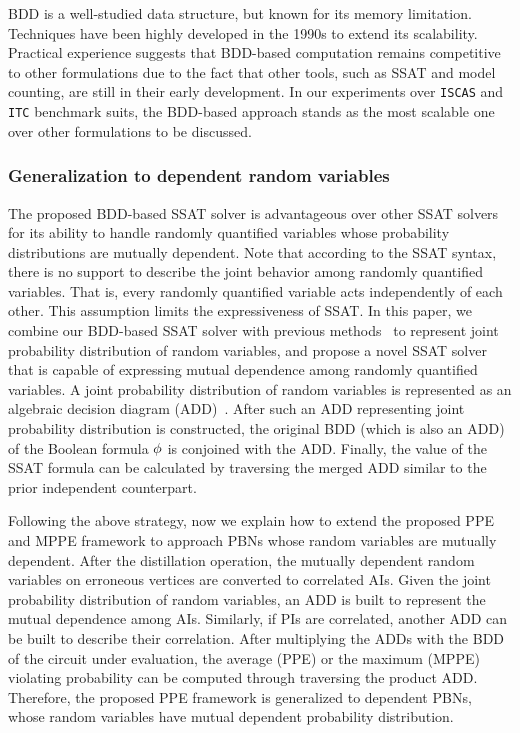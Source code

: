 BDD is a well-studied data structure,
but known for its memory limitation.
Techniques have been highly developed in the 1990s to extend its scalability.
Practical experience suggests that BDD-based computation remains competitive to other formulations
due to the fact that other tools,
such as SSAT and model counting,
are still in their early development.
In our experiments over \texttt{ISCAS} and \texttt{ITC} benchmark suits,
the BDD-based approach stands as the most scalable one over other formulations to be discussed.

\subsubsection{Generalization to dependent random variables}
The proposed BDD-based SSAT solver is advantageous over other SSAT solvers for its ability to handle randomly quantified variables whose probability distributions are mutually dependent.
Note that according to the SSAT syntax,
there is no support to describe the joint behavior among randomly quantified variables.
That is, every randomly quantified variable acts independently of each other.
This assumption limits the expressiveness of SSAT.
In this paper, we combine our BDD-based SSAT solver with previous methods~\cite{Marculescu1998,Miskov-Zivanov2006}
to represent joint probability distribution of random variables,
and propose a novel SSAT solver that is capable of expressing mutual dependence among randomly quantified variables.
A joint probability distribution of random variables is represented as an algebraic decision diagram (ADD)~\cite{Marculescu1998,Miskov-Zivanov2006}.
After such an ADD representing joint probability distribution is constructed,
the original BDD (which is also an ADD) of the Boolean formula $\phi$ is conjoined with the ADD.
Finally, the value of the SSAT formula can be calculated by traversing the merged ADD similar to the prior independent counterpart.

Following the above strategy,
now we explain how to extend the proposed PPE and MPPE framework to approach PBNs whose random variables are mutually dependent.
After the distillation operation,
the mutually dependent random variables on erroneous vertices are converted to correlated AIs.
Given the joint probability distribution of random variables,
an ADD is built to represent the mutual dependence among AIs.
Similarly, if PIs are correlated,
another ADD can be built to describe their correlation.
After multiplying the ADDs with the BDD of the circuit under evaluation,
the average (PPE) or the maximum (MPPE) violating probability can be computed through traversing the product ADD.
Therefore, the proposed PPE framework is generalized to dependent PBNs,
whose random variables have mutual dependent probability distribution.